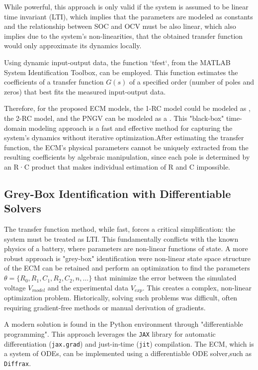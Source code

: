 \documentclass[lettersize,journal]{IEEEtran}
\begin{document}
While powerful, this approach is only valid if the system is assumed to be linear time invariant (LTI), which implies that the parameters are modeled as constants and the relationship between SOC and OCV must be also linear, which also implies due to the system's non-linearities, that the obtained transfer function would only approximate its dynamics locally.

Using dynamic input-output data, the function `tfest`, from the MATLAB System Identification Toolbox,  can be employed. This function estimates the coefficients of a transfer function $G(s)$ of a specified order (number of poles and zeros) that best fits the measured input-output data.

Therefore, for the proposed ECM models, the 1-RC model could be modeled as , the 2-RC model, and the PNGV can be modeled as a . This "black-box" time-domain modeling approach is a fast and effective method for capturing the system's dynamics without iterative optimization\cite{khalfi2021boxjenkins, pai2023online}.After estimating the transfer function, the ECM’s physical parameters cannot be uniquely extracted from the resulting coefficients by algebraic manipulation, since each pole is determined by an R·C product that makes individual estimation of R and C impossible.

\subsection{Grey-Box Identification with Differentiable Solvers}

The transfer function method, while fast, forces a critical simplification: the system must be treated as LTI. This fundamentally conflicts with the known physics of a battery, where parameters are non-linear functions of state\cite{tran2021comprehensive}. A more robust approach is "grey-box" identification were non-linear state space structure of the ECM can be retained and perform an optimization to find the parameters $\theta = \{R_0, R_1, C_1, R_2, C_2,n, \dots\}$ that minimize the error between the simulated voltage $V_{model}$ and the experimental data $V_{exp}$. This creates a complex, non-linear optimization problem. Historically, solving such problems was difficult, often requiring gradient-free methods or manual derivation of gradients.

A modern solution is found in the Python environment through "differentiable programming". This approach leverages the \texttt{JAX} library for automatic differentiation (\texttt{jax.grad}) and just-in-time (\texttt{jit}) compilation\cite{kidger2021diffrax}. The ECM, which is a system of ODEs, can be implemented using a differentiable ODE solver,such as \texttt{Diffrax}.
\end{document}
